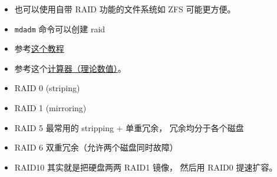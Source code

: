 
\begin{issues}
\issueDraft
\end{issues}

\begin{itemize}
\item 也可以使用自带 RAID 功能的文件系统如 ZFS 可能更方便。
\item \verb|mdadm| 命令可以创建 raid
\item 参考\href{https://www.digitalocean.com/community/tutorials/how-to-create-raid-arrays-with-mdadm-on-ubuntu-22-04}{这个教程}
\item 参考这个\href{https://www.raid-calculator.com/}{计算器（理论数值）}。
\item RAID 0 (striping)
\item RAID 1 (mirroring)
\item RAID 5 最常用的 stripping + 单重冗余， 冗余均分于各个磁盘
\item RAID 6 双重冗余（允许两个磁盘同时故障）
\item RAID10 其实就是把硬盘两两 RAID1 镜像， 然后用 RAID0 提速扩容。
\end{itemize}
